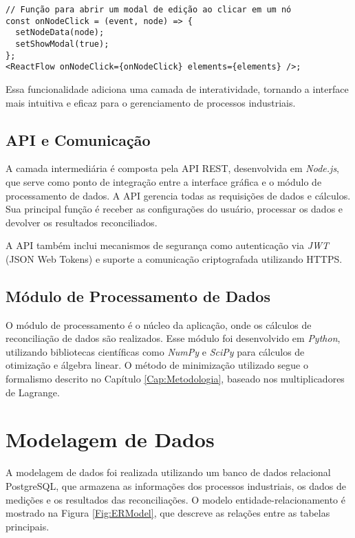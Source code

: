 \begin{verbatim}
// Função para abrir um modal de edição ao clicar em um nó
const onNodeClick = (event, node) => {
  setNodeData(node);
  setShowModal(true);
};
<ReactFlow onNodeClick={onNodeClick} elements={elements} />;
\end{verbatim}

Essa funcionalidade adiciona uma camada de interatividade, tornando a interface mais intuitiva e eficaz para o gerenciamento de processos industriais.

\subsection{API e Comunicação}
\label{Sec:API}

A camada intermediária é composta pela API REST, desenvolvida em \textit{Node.js}, que serve como ponto de integração entre a interface gráfica e o módulo de processamento de dados. A API gerencia todas as requisições de dados e cálculos. Sua principal função é receber as configurações do usuário, processar os dados e devolver os resultados reconciliados.

A API também inclui mecanismos de segurança como autenticação via \textit{JWT} (JSON Web Tokens) e suporte a comunicação criptografada utilizando HTTPS.

\subsection{Módulo de Processamento de Dados}
\label{Sec:ModuloProcessamento}

O módulo de processamento é o núcleo da aplicação, onde os cálculos de reconciliação de dados são realizados. Esse módulo foi desenvolvido em \textit{Python}, utilizando bibliotecas científicas como \textit{NumPy} e \textit{SciPy} para cálculos de otimização e álgebra linear. O método de minimização utilizado segue o formalismo descrito no Capítulo \ref{Cap:Metodologia}, baseado nos multiplicadores de Lagrange.

\section{Modelagem de Dados}
\label{Sec:ModelagemDados}

A modelagem de dados foi realizada utilizando um banco de dados relacional PostgreSQL, que armazena as informações dos processos industriais, os dados de medições e os resultados das reconciliações. O modelo entidade-relacionamento é mostrado na Figura \ref{Fig:ERModel}, que descreve as relações entre as tabelas principais.

